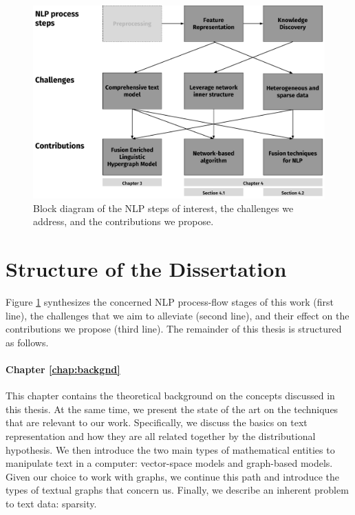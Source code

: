 \begin{figure}
\centering
\includegraphics[width=1\linewidth]{./images/Chapitre1/challenges_contribs.pdf}
\caption{Block diagram of the NLP steps of interest, the challenges we address, and the contributions we propose.}
\label{fig:challenges_contribs}
\end{figure}
\section{Structure of the Dissertation}

Figure \ref{fig:challenges_contribs} synthesizes the concerned NLP process-flow stages of this work (first line), the challenges that we aim to alleviate (second line), and their effect on the contributions we propose (third line). The remainder of this thesis is structured as follows. 

\paragraph{Chapter \ref{chap:backgnd}} This chapter contains the theoretical background on the concepts discussed in this thesis. At the same time, we present the state of the art on the techniques that are relevant to our work. Specifically, we discuss the basics on text representation and how they are all related together by the distributional hypothesis. We then introduce the two main types of mathematical entities to manipulate text in a computer: vector-space models and graph-based models. Given our choice to work with graphs, we continue this path and introduce the types of textual graphs that concern us. Finally, we describe an inherent problem to text data: sparsity.

